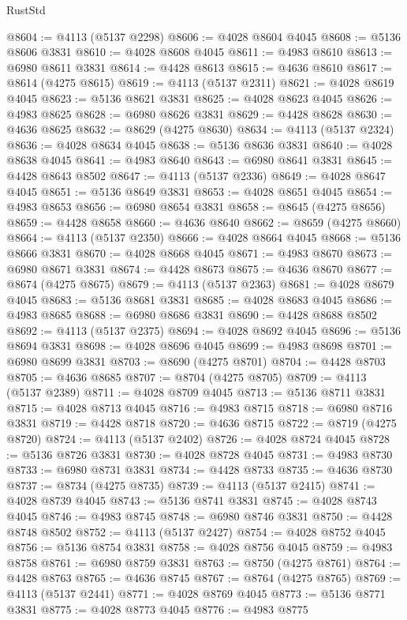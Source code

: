\begin{lexlean}{RustStd}
\begin{coremodule}
@8604 := @4113 (@5137 @2298)
@8606 := @4028 @8604 @4045
@8608 := @5136 @8606 @3831
@8610 := @4028 @8608 @4045
@8611 := @4983 @8610
@8613 := @6980 @8611 @3831
@8614 := @4428 @8613
@8615 := @4636 @8610
@8617 := @8614 (@4275 @8615)
@8619 := @4113 (@5137 @2311)
@8621 := @4028 @8619 @4045
@8623 := @5136 @8621 @3831
@8625 := @4028 @8623 @4045
@8626 := @4983 @8625
@8628 := @6980 @8626 @3831
@8629 := @4428 @8628
@8630 := @4636 @8625
@8632 := @8629 (@4275 @8630)
@8634 := @4113 (@5137 @2324)
@8636 := @4028 @8634 @4045
@8638 := @5136 @8636 @3831
@8640 := @4028 @8638 @4045
@8641 := @4983 @8640
@8643 := @6980 @8641 @3831
@8645 := @4428 @8643 @8502
@8647 := @4113 (@5137 @2336)
@8649 := @4028 @8647 @4045
@8651 := @5136 @8649 @3831
@8653 := @4028 @8651 @4045
@8654 := @4983 @8653
@8656 := @6980 @8654 @3831
@8658 := @8645 (@4275 @8656)
@8659 := @4428 @8658
@8660 := @4636 @8640
@8662 := @8659 (@4275 @8660)
@8664 := @4113 (@5137 @2350)
@8666 := @4028 @8664 @4045
@8668 := @5136 @8666 @3831
@8670 := @4028 @8668 @4045
@8671 := @4983 @8670
@8673 := @6980 @8671 @3831
@8674 := @4428 @8673
@8675 := @4636 @8670
@8677 := @8674 (@4275 @8675)
@8679 := @4113 (@5137 @2363)
@8681 := @4028 @8679 @4045
@8683 := @5136 @8681 @3831
@8685 := @4028 @8683 @4045
@8686 := @4983 @8685
@8688 := @6980 @8686 @3831
@8690 := @4428 @8688 @8502
@8692 := @4113 (@5137 @2375)
@8694 := @4028 @8692 @4045
@8696 := @5136 @8694 @3831
@8698 := @4028 @8696 @4045
@8699 := @4983 @8698
@8701 := @6980 @8699 @3831
@8703 := @8690 (@4275 @8701)
@8704 := @4428 @8703
@8705 := @4636 @8685
@8707 := @8704 (@4275 @8705)
@8709 := @4113 (@5137 @2389)
@8711 := @4028 @8709 @4045
@8713 := @5136 @8711 @3831
@8715 := @4028 @8713 @4045
@8716 := @4983 @8715
@8718 := @6980 @8716 @3831
@8719 := @4428 @8718
@8720 := @4636 @8715
@8722 := @8719 (@4275 @8720)
@8724 := @4113 (@5137 @2402)
@8726 := @4028 @8724 @4045
@8728 := @5136 @8726 @3831
@8730 := @4028 @8728 @4045
@8731 := @4983 @8730
@8733 := @6980 @8731 @3831
@8734 := @4428 @8733
@8735 := @4636 @8730
@8737 := @8734 (@4275 @8735)
@8739 := @4113 (@5137 @2415)
@8741 := @4028 @8739 @4045
@8743 := @5136 @8741 @3831
@8745 := @4028 @8743 @4045
@8746 := @4983 @8745
@8748 := @6980 @8746 @3831
@8750 := @4428 @8748 @8502
@8752 := @4113 (@5137 @2427)
@8754 := @4028 @8752 @4045
@8756 := @5136 @8754 @3831
@8758 := @4028 @8756 @4045
@8759 := @4983 @8758
@8761 := @6980 @8759 @3831
@8763 := @8750 (@4275 @8761)
@8764 := @4428 @8763
@8765 := @4636 @8745
@8767 := @8764 (@4275 @8765)
@8769 := @4113 (@5137 @2441)
@8771 := @4028 @8769 @4045
@8773 := @5136 @8771 @3831
@8775 := @4028 @8773 @4045
@8776 := @4983 @8775

\end{coremodule}
\end{lexlean}
